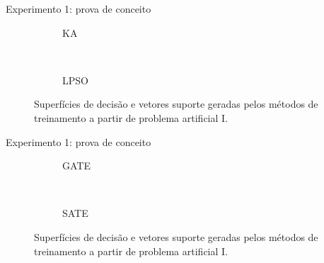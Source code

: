 \documentclass{beamer}
\begin{document}
\begin{frame}[noframenumbering]{Experimento 1: prova de conceito}
\begin{figure}[H]
    \begin{center}  
      \begin{subfigure}[b]{.40\textwidth}
        \caption{KA}
      \end{subfigure}
      ~
      \begin{subfigure}[b]{.40\textwidth}
        \caption{LPSO}
      \end{subfigure}
      
    \end{center}
    \caption{Superfícies de decisão e vetores suporte geradas pelos métodos de treinamento a partir de problema artificial I.}\label{fig:simulacoes-pa-i-resultados}
\end{figure}
\end{frame}





\begin{frame}[noframenumbering]{Experimento 1: prova de conceito}
\begin{figure}[H]
    \begin{center}  
      \begin{subfigure}[b]{.40\textwidth}
        \caption{GATE}
      \end{subfigure}
      ~
      \begin{subfigure}[b]{.40\textwidth}
        \caption{SATE}
      \end{subfigure}
      
    \end{center}
    \caption{Superfícies de decisão e vetores suporte geradas pelos métodos de treinamento a partir de problema artificial I.}\label{fig:simulacoes-pa-i-resultados}
\end{figure}
\end{frame}
\end{document}
